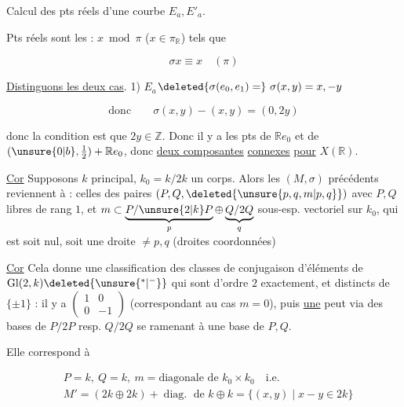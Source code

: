 Calcul  des pts réels d'une courbe $E_a,E'_a$.

Pts réels sont les : $x\bmod\pi$ ($x\in\pi_{\mathbb R}$) tels que

\[
\sigma x\equiv x\quad(\pi)
\]

\uline{Distinguons les deux cas}. 1) \uline{$E_a$}\quad $\deleted{\sigma(e_0,e_1)=}\ \sigma(x,y)=x,-y$

\[
\text{donc}\qquad \sigma(x,y)-(x,y)=(0,2y)
\]

donc la condition est que $2y\in\mathbb Z$. Donc il y a  les pts de  $\mathbb R e_0$ et de  $(\unsure{0|b},\tfrac12)+\mathbb R e_0$, donc \uline{deux composantes} \uline{connexes} \uline{pour} $X(\mathbb R)$.


\uline{Cor} Supposons $k$ principal,  $k_0=k/2k$ un corps. Alors les  $(M,\sigma)$ précédents reviennent à : celles des paires $(P,Q,\deleted{\unsure{p,q,m|p,q}})$ avec $P,Q$ libres de rang $1$, et  $m\subset\underbrace{P/\unsure{2|k}P}_{p}\oplus\underbrace{Q/2Q}_{q}$ sous-esp. vectoriel sur $k_0$,  qui est soit nul, soit une droite $\ne p,q$ (droites coordonnées)

\uline{Cor} Cela donne une classification des classes de conjugaison d'éléments de $\mathrm{Gl}(2,k)\deleted{\unsure{^*|^-}}$ qui sont d'ordre $2$ exactement, et distincts de $\{\pm1\}$ : il y  a  $\left(\begin{smallmatrix}1&0\\0&-1\end{smallmatrix}\right)$ (correspondant au cas $m=0$), puis \uline{une}   peut via des bases de $P/2P$ resp. $Q/2Q$ se ramenant à une base de $P,Q$.

Elle correspond à

\[
\begin{aligned}
&P=k,\ Q=k,\ m=\text{diagonale de }k_0\times k_0\quad\text{i.e.}\\
&M'=(2k\oplus2k)+\operatorname{diag.}\text{ de }k\oplus k=\{(x,y)\mid x-y\in2k\}
\end{aligned}
\]

